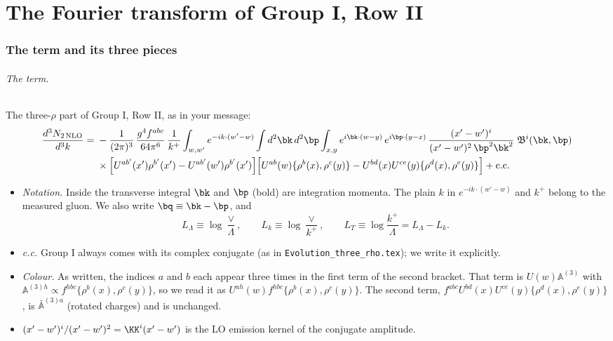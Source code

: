 \part{The Fourier transform of Group I, Row II}\label{part:ft}
\section{The term and its three pieces}\label{sec:ft-input}

\paragraph{The term.} The three-$\rho$ part of Group I, Row II, as in your message:
\begin{align}
\frac{d^3N_{2\,\rm NLO}}{d^3k}={}&-\frac{1}{(2\pi)^3}\,\frac{g^4f^{abc}}{64\pi^6}\,\frac{1}{k^+}\int_{w,w'}e^{-ik\cdot(w'-w)}\int d^2\bk\,d^2\bp\int_{x,y}e^{i\bk\cdot(w-y)}\,e^{i\bp\cdot(y-x)}\,\frac{(x'-w')^i}{(x'-w')^2\,\bp^2\bk^2}\;\mathfrak B^i(\bk,\bp)\notag\\
&\times\Big[U^{ab'}(x')\rho^{b'}(x')-U^{ab'}(w')\rho^{b'}(x')\Big]\Big[U^{ab}(w)\{\rho^b(x),\rho^c(y)\}-U^{bd}(x)U^{ce}(y)\{\rho^d(x),\rho^e(y)\}\Big]+{\rm c.c.}
\label{eq:ft-term}
\end{align}
\begin{itemize}
\item \emph{Notation.} Inside the transverse integral $\bk$ and $\bp$ (bold) are integration momenta. The plain $k$ in $e^{-ik\cdot(w'-w)}$ and $k^+$ belong to the measured gluon. We also write $\bq\equiv\bk-\bp$, and
\begin{equation}
L_\Lambda\equiv\log\frac{\vee}{\Lambda},\qquad L_k\equiv\log\frac{\vee}{k^+},\qquad L_T\equiv\log\frac{k^+}{\Lambda}=L_\Lambda-L_k .
\end{equation}
\item \emph{c.c.} Group I always comes with its complex conjugate (as in \texttt{Evolution\_three\_rho.tex}); we write it explicitly.
\item \emph{Colour.} As written, the indices $a$ and $b$ each appear three times in the first term of the second bracket. That term is $U(w)\mathbb A^{(3)}$ with $\mathbb A^{(3)h}\propto f^{hbc}\{\rho^b(x),\rho^c(y)\}$, so we read it as $U^{ah}(w)f^{hbc}\{\rho^b(x),\rho^c(y)\}$. The second term, $f^{abc}U^{bd}(x)U^{ce}(y)\{\rho^d(x),\rho^e(y)\}$, is $\bar{\mathbb A}^{(3)a}$ (rotated charges) and is unchanged.
\item $(x'-w')^i/(x'-w')^2=\KK^i(x'-w')$ is the LO emission kernel of the conjugate amplitude.
\end{itemize}

